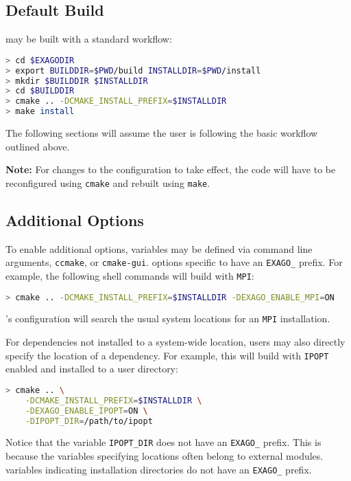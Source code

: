 \subsection{Default Build}

\exago may be built with a standard \cmake workflow:

\begin{lstlisting}[language=bash,caption={Example \cmake workflow}]
> cd $EXAGODIR
> export BUILDDIR=$PWD/build INSTALLDIR=$PWD/install
> mkdir $BUILDDIR $INSTALLDIR
> cd $BUILDDIR
> cmake .. -DCMAKE_INSTALL_PREFIX=$INSTALLDIR
> make install
\end{lstlisting}

\noindent
The following sections will assume the user is following the basic workflow outlined above.

\textbf{Note:} For changes to the \cmake configuration to take effect, the code will have to be reconfigured using \texttt{cmake} and rebuilt using \texttt{make}.

\subsection{Additional Options}

To enable additional options, \cmake variables may be defined via \cmake command line arguments, \texttt{ccmake}, or \texttt{cmake-gui}.
\cmake options specific to \exago have an \texttt{EXAGO\_} prefix.
For example, the following shell commands will build \exago with \texttt{MPI}:

\begin{lstlisting}[language=bash]
> cmake .. -DCMAKE_INSTALL_PREFIX=$INSTALLDIR -DEXAGO_ENABLE_MPI=ON
\end{lstlisting}

\noindent
\exago's \cmake configuration will search the usual system locations for an \texttt{MPI} installation.

For dependencies not installed to a system-wide location, users may also directly specify the location of a dependency.
For example, this will build \exago with \texttt{IPOPT} enabled and installed to a user directory:

\begin{lstlisting}[language=bash]
> cmake .. \
    -DCMAKE_INSTALL_PREFIX=$INSTALLDIR \
    -DEXAGO_ENABLE_IPOPT=ON \
    -DIPOPT_DIR=/path/to/ipopt
\end{lstlisting}

\noindent
Notice that the \cmake variable \texttt{IPOPT\_DIR} does not have an \texttt{EXAGO\_} prefix.
This is because the variables specifying locations often belong to external \cmake modules.
\cmake variables indicating installation directories do not have an \texttt{EXAGO\_} prefix.

